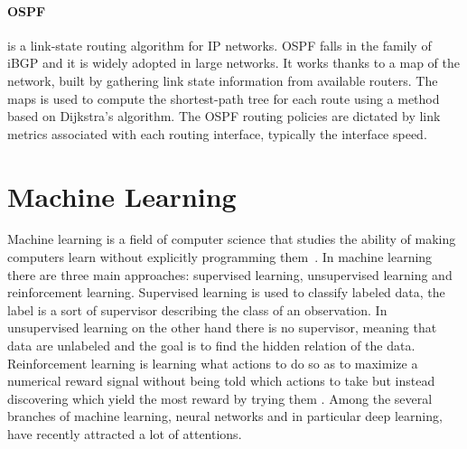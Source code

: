 \paragraph{OSPF} is a link-state routing algorithm for IP networks. OSPF falls in the family of iBGP and it is widely adopted in large networks. It works thanks to a map of the network, built by gathering link state information from available routers. The maps is used to compute the shortest-path tree for each route using a method based on Dijkstra's algorithm. The OSPF routing policies are dictated by link metrics associated with each routing interface, typically the interface speed.

\section{Machine Learning}
Machine learning is a field of computer science that studies the ability of making computers learn without explicitly programming them~\cite{5392560}. In machine learning there are three main approaches: supervised learning, unsupervised learning and reinforcement learning. Supervised learning is used to classify labeled data, the label is a sort of supervisor describing the class of an observation. In unsupervised learning on the other hand there is no supervisor, meaning that data are unlabeled and the goal is to find the hidden relation of the data. Reinforcement learning is learning what actions to do so as to maximize a numerical reward signal without being told which actions to take but instead discovering which yield the most reward by trying them \cite{Sutton98reinforcementlearning}. Among the several branches of machine learning, neural networks and in particular deep learning, have recently attracted a lot of attentions.

